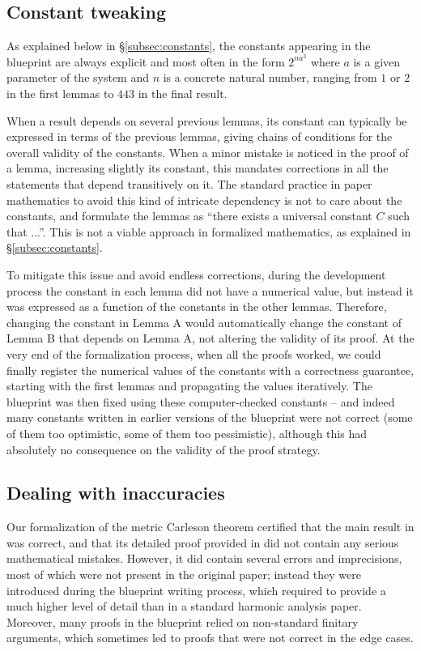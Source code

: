 \documentclass[12pt]{amsart}
\theoremstyle{definition}
\theoremstyle{plain}
\begin{document}
\subsection{Constant tweaking} As explained below in
\S\ref{subsec:constants}, the constants appearing in the blueprint
are always explicit and most often in the form $2^{n a^3}$ where $a$ is a
given parameter of the system and $n$ is a concrete natural number, ranging
from $1$ or $2$ in the first lemmas to $443$ in the final result.

When a result depends on several previous lemmas, its constant can typically
be expressed in terms of the previous lemmas, giving chains of conditions for
the overall validity of the constants. When a minor mistake is noticed in the
proof of a lemma, increasing slightly its constant, this mandates corrections
in all the statements that depend transitively on it. The standard practice
in paper mathematics to avoid this kind of intricate dependency is not to
care about the constants, and formulate the lemmas as ``there exists a
universal constant $C$ such that ...''. This is not a viable approach in
formalized mathematics, as explained in \S\ref{subsec:constants}.

To mitigate this issue and avoid endless corrections, during the development
process the constant in each lemma did not have a numerical value, but
instead it was expressed as a function of the constants in the other lemmas.
Therefore, changing the constant in Lemma A would automatically change the
constant of Lemma B that depends on Lemma A, not altering the validity of its
proof. At the very end of the formalization process, when all the proofs
worked, we could finally register the numerical values of the constants with
a correctness guarantee, starting with the first lemmas and propagating the
values iteratively. The blueprint was then fixed using these computer-checked
constants -- and indeed many constants written in earlier versions of the
blueprint were not correct (some of them too optimistic, some of them too
pessimistic), although this had absolutely no consequence on the validity of
the proof strategy.


\subsection{Dealing with inaccuracies}\label{subsec:blueprint_mistakes}

Our formalization of the metric Carleson theorem certified that the main result in \cite{ThieleCarlesonPreprint}  was correct, and that its detailed proof provided in \cite{CarlesonBlueprint} did not contain any serious mathematical mistakes. However, it did contain several errors and imprecisions, most of which were not present in the original paper; instead they were introduced during the blueprint writing process, which required to provide a much higher level of detail than in a standard harmonic analysis paper. Moreover, many proofs in the blueprint relied on non-standard finitary arguments, which sometimes led to proofs that were not correct in the edge cases.
\end{document}
